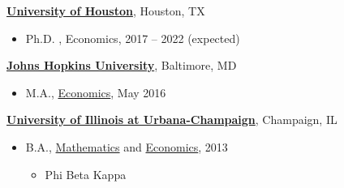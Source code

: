 \documentclass[10pt]{article}
\newenvironment{outerlist}[1][\enskip\textbullet]%
        {\begin{itemize}[#1,leftmargin=*]}{\end{itemize}%
         \vspace{-.6\baselineskip}}
\newenvironment{innerlist}[1][\enskip\textbullet]%
        {\begin{itemize}[#1,leftmargin=*,parsep=0pt,itemsep=0pt,topsep=0pt,partopsep=0pt]}
        {\end{itemize}}
\begin{document}
\href{http://www.uh.edu/}{\textbf{University of Houston}},
Houston, TX
\begin{outerlist}

\item[] {Ph.D. }, Economics, 2017 -- 2022 (expected)

\end{outerlist}
\vspace{.1in}
\href{https://www.jhu.edu/}{\textbf{Johns Hopkins University}},
Baltimore, MD
\begin{outerlist}
	\item[] M.A.,
	\href{http://econ.jhu.edu/}
	{Economics}, May 2016

\end{outerlist}
\vspace{.1in}
\href{http://illinois.edu/}{\textbf{University of Illinois at Urbana-Champaign}},
Champaign, IL
\begin{outerlist}
\item[] B.A.,
        \href{http://www.math.uiuc.edu/}
             {Mathematics} and \href{http://www.economics.illinois.edu/}{Economics}, 2013
        \begin{innerlist}
        \item Phi Beta Kappa
        \end{innerlist}
\end{outerlist}
\end{document}
